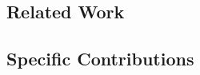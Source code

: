 \subsection{Related Work}
\label{subsec:intro_related_work}


\subsection{Specific Contributions}


